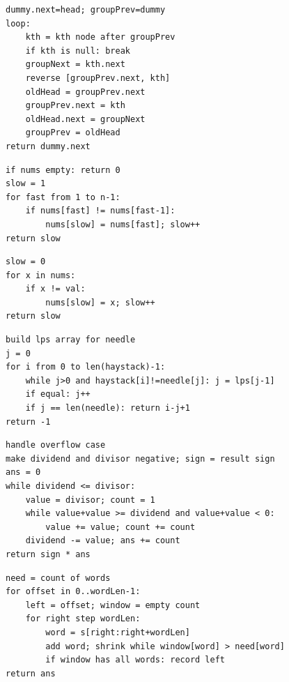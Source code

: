 \documentclass[11pt,a4paper]{ctexart}
\begin{document}
\begin{verbatim}
dummy.next=head; groupPrev=dummy
loop:
    kth = kth node after groupPrev
    if kth is null: break
    groupNext = kth.next
    reverse [groupPrev.next, kth]
    oldHead = groupPrev.next
    groupPrev.next = kth
    oldHead.next = groupNext
    groupPrev = oldHead
return dummy.next
\end{verbatim}

\begin{verbatim}
if nums empty: return 0
slow = 1
for fast from 1 to n-1:
    if nums[fast] != nums[fast-1]:
        nums[slow] = nums[fast]; slow++
return slow
\end{verbatim}

\begin{verbatim}
slow = 0
for x in nums:
    if x != val:
        nums[slow] = x; slow++
return slow
\end{verbatim}

\begin{verbatim}
build lps array for needle
j = 0
for i from 0 to len(haystack)-1:
    while j>0 and haystack[i]!=needle[j]: j = lps[j-1]
    if equal: j++
    if j == len(needle): return i-j+1
return -1
\end{verbatim}

\begin{verbatim}
handle overflow case
make dividend and divisor negative; sign = result sign
ans = 0
while dividend <= divisor:
    value = divisor; count = 1
    while value+value >= dividend and value+value < 0:
        value += value; count += count
    dividend -= value; ans += count
return sign * ans
\end{verbatim}

\begin{verbatim}
need = count of words
for offset in 0..wordLen-1:
    left = offset; window = empty count
    for right step wordLen:
        word = s[right:right+wordLen]
        add word; shrink while window[word] > need[word]
        if window has all words: record left
return ans
\end{verbatim}
\end{document}
